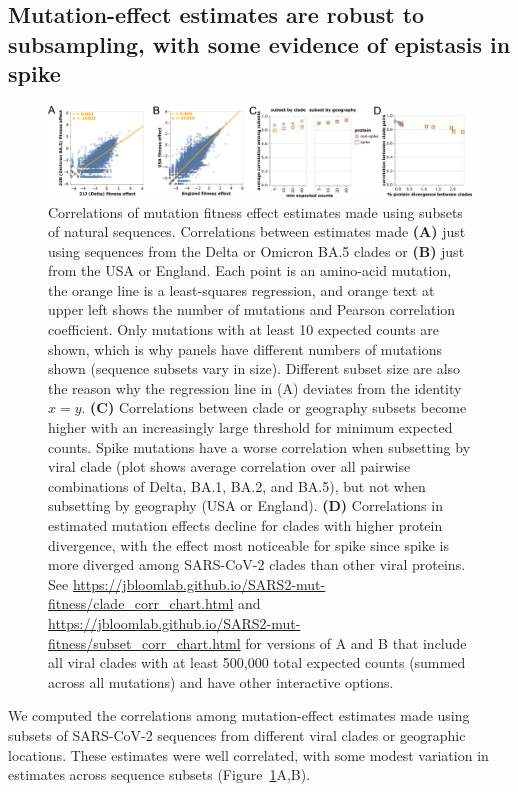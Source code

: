 \documentclass[9pt,twocolumn,twoside]{gsajnl_modified}
\begin{document}
\subsection*{Mutation-effect estimates are robust to subsampling, with some evidence of epistasis in spike}

\begin{figure}
\centering
\includegraphics[width=\linewidth]{figs/corr.png}
\caption{
Correlations of mutation fitness effect estimates made using subsets of natural sequences.
Correlations between estimates made {\bf (A)} just using sequences from the Delta or Omicron BA.5 clades or {\bf (B)} just from the USA or England.
Each point is an amino-acid mutation, the orange line is a least-squares regression, and orange text at upper left shows the number of mutations and Pearson correlation coefficient.
Only mutations with at least 10 expected counts are shown, which is why panels have different numbers of mutations shown (sequence subsets vary in size).
Different subset size are also the reason why the regression line in (A) deviates from the identity $x=y$.
{\bf (C)} Correlations between clade or geography subsets become higher with an increasingly large threshold for minimum expected counts.
Spike mutations have a worse correlation when subsetting by viral clade (plot shows average correlation over all pairwise combinations of Delta, BA.1, BA.2, and BA.5), but not when subsetting by geography (USA or England).
{\bf (D)} Correlations in estimated mutation effects decline for clades with higher protein divergence, with the effect most noticeable for spike since spike is more diverged among SARS-CoV-2 clades than other viral proteins.
See \url{https://jbloomlab.github.io/SARS2-mut-fitness/clade_corr_chart.html} and \url{https://jbloomlab.github.io/SARS2-mut-fitness/subset_corr_chart.html} for versions of A and B that include all viral clades with at least 500,000 total expected counts (summed across all mutations) and have other interactive options.
\label{fig:corr}
}
\end{figure}

We computed the correlations among mutation-effect estimates made using subsets of SARS-CoV-2 sequences from different viral clades or geographic locations.
These estimates were well correlated, with some modest variation in estimates across sequence subsets (Figure~\ref{fig:corr}A,B).
\end{document}
